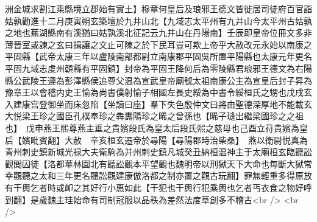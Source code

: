 洲金城求割江乘縣境立郡始有實土】穆章何皇后及琅邪王德文皆徙居司徒府百官詣姑孰勸進十二月庚寅朔玄築壇於九井山北【九域志太平州有九井山今太平州古姑孰之地也蕪湖縣南有溪猶曰姑孰溪北征記云九井山在丹陽南】壬辰即皇帝位冊文多非薄晉室或諫之玄曰揖讓之文止可陳之於下民耳豈可欺上帝乎大赦改元永始以南康之平固縣【武帝太康三年以盧陵南部都尉立南康郡平固吳所置平陽縣也太康元年更名平固九域志䖍州贑縣有平固鎮】封帝為平固王降何后為零陵縣君琅邪王德文為右陽縣公武陵王遵為彭澤縣侯追尊父温為宣武皇帝廟號太祖南康公主為宣皇后封子昇為豫章王以會稽内史王愉為尚書僕射愉子相國左長史綏為中書令綏桓氏之甥也戊戌玄入建康宫登御坐而床忽陷【坐讀曰座】羣下失色殷仲文曰將由聖德深厚地不能載玄大悦梁王珍之國臣孔樸奉珍之犇夀陽珍之晞之曾孫也【晞子㻱出繼梁國珍之之祖也】　戊申燕王熙尊燕主垂之貴嬪段氏為皇太后段氏熙之慈母也己酉立苻貴嬪為皇后【嬪毗賓翻】大赦　辛亥桓玄遷帝於尋陽【尋陽郡時治柴桑】　燕以衛尉悦真為青州刺史鎮新城光禄大夫衛駒為并州刺史鎮凡城癸丑納桓温神主于太廟桓玄臨聽訟觀閲囚徒【洛都華林園北有聽訟觀本平望觀也魏明帝以刑獄天下大命也每斷大獄常幸觀聽之太和三年更名聽訟觀建康倣洛都之制亦置之觀古玩翻】罪無輕重多得原放有干輿乞者時或卹之其好行小惠如此【干犯也干輿行犯乘輿也乞者丐衣食之物好呼到翻】是歲魏主珪始命有司制冠服以品秩為差然法度草創多不稽古<br />
<br />
